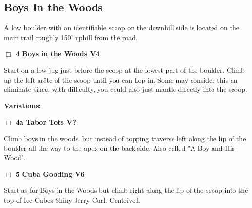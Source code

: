 	\begin{multicols}{2}

\needspace{10em}
\subsection*{Boys In the Woods}\label{bf:Boys In the Woods}

A low boulder with an identifiable scoop on the downhill side is located on the main trail roughly 150' uphill from the road.\\



\needspace{2em}
\label{rt:Boys in the Woods}
\colorbox{RoyalBlue!20}{
\parbox{0.95\linewidth}{
\hspace{-1ex}\textbf{$\Box$
4 Boys in the Woods V4  
}}}
\begin{adjustwidth}{1.3em}{}			

Start on a low jug just before the scoop at the lowest part of the boulder. Climb up the left arête of the scoop until you can flop in. Some may consider this an eliminate since, with difficulty, you could also just mantle directly into the scoop.
\end{adjustwidth}


\begin{adjustwidth}{0.5cm}{}				
\needspace{4em}
\textbf{Variations:} \newline

\needspace{2em}
\label{vr:Tabor Tots}
\colorbox{black!20}{
\parbox{0.95\linewidth}{
\hspace{-1ex}\textbf{$\Box$
4a Tabor Tots V?  
}}}
\begin{adjustwidth}{1.3em}{}			

Climb boys in the woods, but instead of topping traverse left along the lip of the boulder all the way to the apex on the back side. Also called "A Boy and His Wood".
\end{adjustwidth}



\end{adjustwidth}


\needspace{2em}
\label{rt:Cuba Gooding}
\colorbox{RoyalBlue!20}{
\parbox{0.95\linewidth}{
\hspace{-1ex}\textbf{$\Box$
5 Cuba Gooding V6  
}}}
\begin{adjustwidth}{1.3em}{}			

Start as for Boys in the Woods but climb right along the lip of the scoop into the top of Ice Cubes Shiny Jerry Curl. Contrived.
\end{adjustwidth}



\end{multicols}

